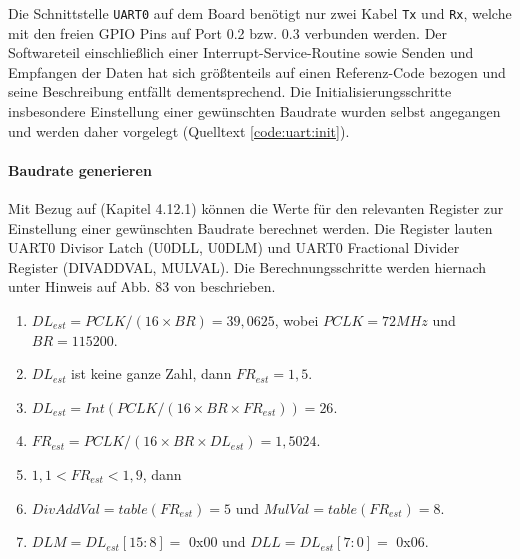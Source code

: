 
Die Schnittstelle \texttt{UART0} auf dem Board benötigt nur zwei Kabel \texttt{Tx} und \texttt{Rx}, welche mit den freien GPIO Pins auf Port 0.2 bzw. 0.3 verbunden werden. Der Softwareteil einschließlich einer Interrupt-Service-Routine sowie Senden und Empfangen der Daten hat sich größtenteils auf einen Referenz-Code bezogen und seine Beschreibung entfällt dementsprechend. Die Initialisierungsschritte insbesondere Einstellung einer gewünschten Baudrate wurden selbst angegangen und werden daher vorgelegt (Quelltext \ref{code:uart:init}).

\paragraph{Baudrate generieren} 
Mit Bezug auf \cite{nxp.lpc23xx.user_manual} (Kapitel 4.12.1) können die Werte für den relevanten Register zur Einstellung einer gewünschten Baudrate berechnet werden. Die Register lauten UART0 Divisor Latch (U0DLL, U0DLM) und UART0 Fractional Divider Register (DIVADDVAL, MULVAL). Die Berechnungsschritte werden hiernach unter Hinweis auf Abb. 83 von \cite{nxp.lpc23xx.user_manual} beschrieben.

\begin{enumerate}
\item $DL_{est} = PCLK/(16 \times BR) = 39,0625$, wobei $PCLK = 72 MHz$ und $BR = 115200$.
\item $DL_{est}$ ist keine ganze Zahl, dann $FR_{est} = 1,5$.
\item $DL_{est} = Int ( PCLK/(16 \times BR \times FR_{est}) ) = 26$.
\item $FR_{est} = PCLK/(16 \times BR \times DL_{est}) = 1,5024$.
\item $1,1 < FR_{est} < 1,9$, dann
\item $DivAddVal = table (FR_{est}) = 5$ und $MulVal = table (FR_{est}) = 8$.
\item $DLM = DL_{est}[15:8] =$ 0x00 und $DLL = DL_{est}[7:0] =$ 0x06.
\end{enumerate}

